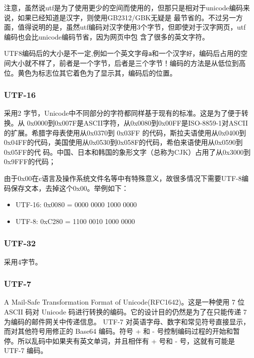 \documentclass[doctor,openright,twoside]{sjtuthesis}
\providecommand{\tightlist}{%
    \setlength{\itemsep}{0pt}\setlength{\parskip}{0pt}}
\newcommand{\passthrough}[1]{#1}
\theoremstyle{plain}
\theoremstyle{definition}
\theoremstyle{remark}
\theoremstyle{ocrenumbox}
\theoremstyle{plain}
\begin{document}
注意，虽然说utf是为了使用更少的空间而使用的，但那只是相对于unicode编码来说，如果已经知道是汉字，则使用GB2312/GBK无疑是 最节省的。不过另一方面，值得说明的是，虽然utf编码对汉字使用3个字节，但即使对于汉字网页，utf编码也会比unicode编码节省，因为网页中包 含了很多的英文字符。

UTF8编码后的大小是不一定,例如一个英文字母\passthrough{\lstinline!a!}和一个汉字\passthrough{\lstinline!好!}，编码后占用的空间大小就不样了，前者是一个字节，后者是三个字节！编码的方法是从低位到高位。黄色为标志位其它着色为了显示其，编码后的位置。

\hypertarget{utf-16}{%
\subsubsection{UTF-16}\label{utf-16}}

采用2 字节，Unicode中不同部分的字符都同样基于现有的标准。这是为了便于转换。从 0x0000到0x007F是ASCII字符，从0x0080到0x00FF是ISO-8859-1对ASCII的扩展。希腊字母表使用从0x0370到 0x03FF 的代码，斯拉夫语使用从0x0400到0x04FF的代码，美国使用从0x0530到0x058F的代码，希伯来语使用从0x0590到0x05FF的代 码。中国、日本和韩国的象形文字（总称为CJK）占用了从0x3000到0x9FFF的代码；

由于0x00在c语言及操作系统文件名等中有特殊意义，故很多情况下需要UTF-8编码保存文本，去掉这个0x00。举例如下：

\begin{itemize}
\tightlist
\item
  UTF-16: 0x0080 = 0000 0000 1000 0000
\item
  UTF-8: 0xC280 = 1100 0010 1000 0000
\end{itemize}

\hypertarget{utf-32}{%
\subsubsection{UTF-32}\label{utf-32}}

采用4字节。

\hypertarget{utf-7}{%
\subsubsection{UTF-7}\label{utf-7}}

A Mail-Safe Transformation Format of Unicode(RFC1642)。这是一种使用 7 位 ASCII 码对 Unicode 码进行转换的编码。它的设计目的仍然是为了在只能传递 7 为编码的邮件网关中传递信息。 UTF-7 对英语字母、数字和常见符号直接显示，而对其他符号用修正的 Base64 编码。符号 + 和 - 号控制编码过程的开始和暂停。所以乱码中如果夹有英文单词，并且相伴有 + 号和 - 号，这就有可能是 UTF-7 编码。
\end{document}
